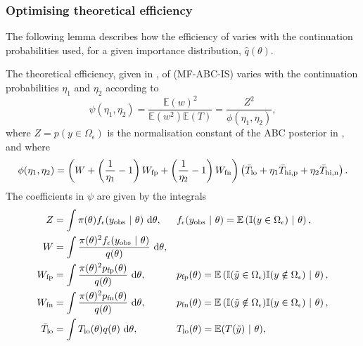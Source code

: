 \documentclass[review,demo]{siamonline190516}
\begin{document}
\subsubsection{Optimising theoretical efficiency}
\label{s:eta:exact}

The following lemma describes how the efficiency of  varies with the continuation probabilities used, for a given importance distribution, $\hat q(\theta)$. 

\begin{lemma}
\label{lemma:phi}
The theoretical efficiency, given in , of  (MF-ABC-IS) varies with the continuation probabilities $\eta_1$ and $\eta_2$ according to
\[
\psi(\eta_1,\eta_2) = \frac{\mathbb E(w)^2}{\mathbb E(w^2) \mathbb E(T)} = \frac{Z^2}{\phi(\eta_1, \eta_2)},
\]
where $Z = p(y \in \Omega_\epsilon)$ is the normalisation constant of the ABC posterior in , and where
\begin{equation}
\label{eq:Phi}
\phi(\eta_1, \eta_2) = 
\left(  W + \left( \frac{1}{\eta_1} - 1 \right) \fp W + \left( \frac{1}{\eta_2} - 1 \right) \fn W \right)
\left( \bar{T}_{\mathrm{lo}}
 + \eta_1 \bar T_{\mathrm{hi}, \mathrm p}
 + \eta_2 \bar T_{\mathrm{hi}, \mathrm n} \right).
\end{equation}
The coefficients in $\psi$ are given by the integrals
\begin{subequations}
\label{eq:PhiComponents}
\begin{align}
\label{eq:Z}
Z &= \int \pi(\theta) f_\epsilon(\obs y~|~\theta) ~\mathrm d\theta
,&
&f_\epsilon(\obs y~|~\theta) = \mathbb E \left(\mathbb I(y \in \Omega_\epsilon) ~|~\theta \right) 
,\\
W &= \int \frac{\pi(\theta)^2 f_\epsilon(\obs y~|~\theta)}{q(\theta)} ~\mathrm d\theta
,\\
\fp W &= \int \frac{\pi(\theta)^2 \fp p(\theta)}{q(\theta)} ~\mathrm d\theta 
,&
&\fp p(\theta) = \mathbb E \left(\mathbb I ( \tilde y \in \Omega_\epsilon) \mathbb I(y \notin \Omega_\epsilon) ~|~\theta \right) 
,\\
\fn W &= \int \frac{\pi(\theta)^2 \fn p(\theta)}{q(\theta)} ~\mathrm d\theta 
,&
&\fn p(\theta) = \mathbb E \left(\mathbb I ( \tilde y \notin \Omega_\epsilon) \mathbb I(y \in \Omega_\epsilon) ~|~\theta \right) 
,\\
\bar T_{\mathrm{lo}} &= \int T_{\mathrm{lo}}(\theta) q(\theta) ~\mathrm d\theta
,&
&T_{\mathrm{lo}}(\theta) = \mathbb E(T(\tilde y) ~|~\theta)
,\\

\end{align}
\end{subequations}
\end{lemma}
\end{document}
